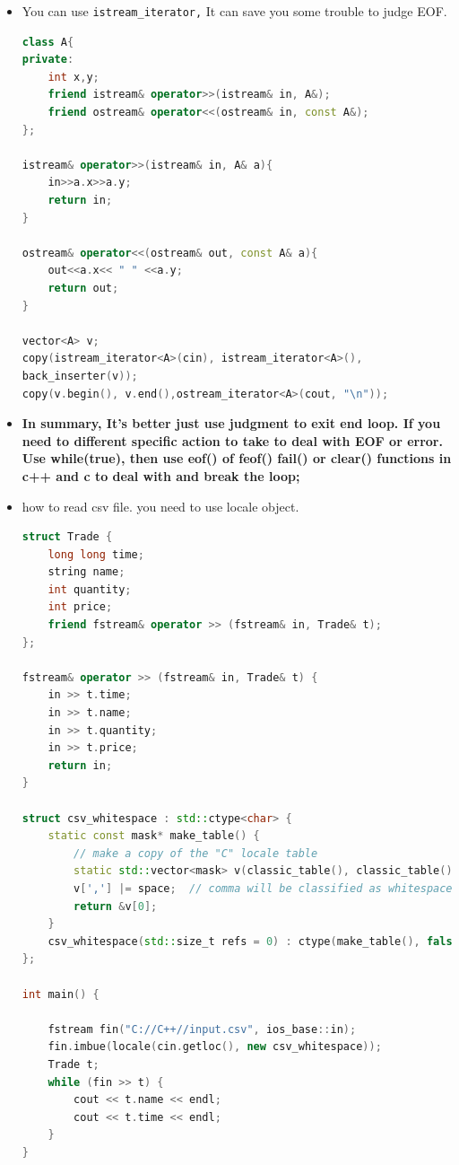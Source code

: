\documentclass[a4paper,11pt,twoside]{book}
\begin{document}
\begin{itemize}
\begin{lstlisting}[numbers=none]
while(!issapce(cin.get()))
	continue;  //method 2
	
basic_istream& ignore(streamsize _Count = 1, \
int_type _Delim = traits_type::eof());  //method 3
cin.ignore(5, 'a');
cin.ignore(numeric_limits<streamsize>::max(), '\n');
\end{lstlisting}
	
	\item You can use \texttt{istream\_iterator,} It can save you some trouble to judge EOF.
	
\begin{lstlisting}[frame=single, language=c++]
class A{
private:
	int x,y;
	friend istream& operator>>(istream& in, A&);
	friend ostream& operator<<(ostream& in, const A&);
};
	
istream& operator>>(istream& in, A& a){
	in>>a.x>>a.y;
	return in;
}
	
ostream& operator<<(ostream& out, const A& a){
	out<<a.x<< " " <<a.y;
	return out;
}
	
vector<A> v;
copy(istream_iterator<A>(cin), istream_iterator<A>(),
back_inserter(v));
copy(v.begin(), v.end(),ostream_iterator<A>(cout, "\n"));
\end{lstlisting}
	
	
	\item \textbf{In summary, It's better just use judgment to exit end loop.  If you need to different specific action to take to deal with EOF or error. Use while(true), then use eof() of feof() fail() or clear() functions in c++ and c to deal with and break the loop; }
	
	\item how to read csv file. you need to use locale object. 
\begin{lstlisting}[frame=single, language=c++]	
struct Trade {
	long long time;
	string name;
	int quantity;
	int price;
	friend fstream& operator >> (fstream& in, Trade& t);
};

fstream& operator >> (fstream& in, Trade& t) {
	in >> t.time;
	in >> t.name;
	in >> t.quantity;
	in >> t.price;
	return in;
}

struct csv_whitespace : std::ctype<char> {
	static const mask* make_table() {
		// make a copy of the "C" locale table
		static std::vector<mask> v(classic_table(), classic_table() + table_size);
		v[','] |= space;  // comma will be classified as whitespace
		return &v[0];
	}
	csv_whitespace(std::size_t refs = 0) : ctype(make_table(), false, refs) {}
};

int main() {    
	
	fstream fin("C://C++//input.csv", ios_base::in);
	fin.imbue(locale(cin.getloc(), new csv_whitespace));
	Trade t;
	while (fin >> t) {
		cout << t.name << endl;
		cout << t.time << endl;
	}	
}
\end{lstlisting}	

\end{itemize}
\end{document}

